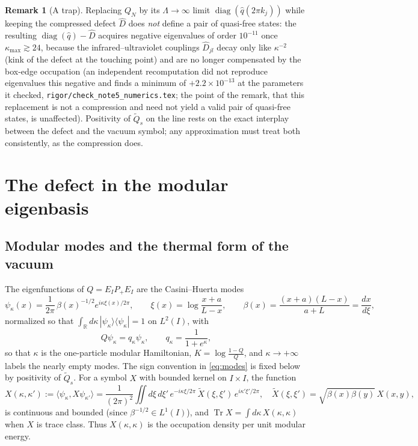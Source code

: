 \documentclass[11pt]{article}
\theoremstyle{accent}
\theoremstyle{definition}
\newtheorem{remark}[theorem]{Remark}
\newcommand{\Tr}{\operatorname{Tr}}
\begin{document}
\begin{remark}[A trap]
Replacing \(Q_N\) by its \(\Lambda\to\infty\) limit \(\operatorname{diag}(\widehat q(2\pi k_j))\) while keeping the compressed defect \(\widehat D\) does \emph{not} define a pair of quasi-free states: the resulting \(\operatorname{diag}(\widehat q)-\widehat D\) acquires negative eigenvalues of order \(10^{-11}\) once \(\kappa_{\max}\gtrsim24\), because the infrared--ultraviolet couplings \(\widehat D_{jl}\) decay only like \(\kappa^{-2}\) (kink of the defect at the touching point) and are no longer compensated by the box-edge occupation (an independent recomputation did not reproduce eigenvalues this negative and finds a minimum of \(+2.2\times10^{-13}\) at the parameters it checked, \texttt{rigor/check\_note5\_numerics.tex}; the point of the remark, that this replacement is not a compression and need not yield a valid pair of quasi-free states, is unaffected).  Positivity of \(\widetilde Q_s\) on the line rests on the exact interplay between the defect and the vacuum symbol; any approximation must treat both consistently, as the compression does.
\end{remark}

\section{The defect in the modular eigenbasis}\label{sec:modular}

\subsection{Modular modes and the thermal form of the vacuum}

The eigenfunctions of \(Q=E_IP_+E_I\) are the Casini--Huerta modes
\begin{equation}\label{eq:modes}
 \psi_\kappa(x)=\frac{1}{2\pi}\,\beta(x)^{-1/2}e^{i\kappa\xi(x)/2\pi},
 \qquad
 \xi(x)=\log\frac{x+a}{L-x},\qquad \beta(x)=\frac{(x+a)(L-x)}{a+L}=\frac{dx}{d\xi},
\end{equation}
normalized so that \(\int_{\mathbb R}d\kappa\,|\psi_\kappa\rangle\langle\psi_\kappa|=1\) on \(L^2(I)\), with
\begin{equation}\label{eq:fermi}
 Q\psi_\kappa=q_\kappa\psi_\kappa,\qquad q_\kappa=\frac1{1+e^{\kappa}},
\end{equation}
so that \(\kappa\) is the one-particle modular Hamiltonian, \(K=\log\frac{1-Q}{Q}\), and \(\kappa\to+\infty\) labels the nearly empty modes.  The sign convention in \eqref{eq:modes} is fixed below by positivity of \(\widetilde Q_s\).  For a symbol \(X\) with bounded kernel on \(I\times I\), the function
\begin{equation}\label{eq:mode-kernel}
 X(\kappa,\kappa'):=\langle\psi_\kappa,X\psi_{\kappa'}\rangle
 =\frac{1}{(2\pi)^2}\iint d\xi\,d\xi'\,e^{-i\kappa\xi/2\pi}\,\widetilde X(\xi,\xi')\,e^{i\kappa'\xi'/2\pi},
 \quad \widetilde X(\xi,\xi')=\sqrt{\beta(x)\beta(y)}\,X(x,y),
\end{equation}
is continuous and bounded (since \(\beta^{-1/2}\in L^1(I)\)), and \(\Tr X=\int d\kappa\,X(\kappa,\kappa)\) when \(X\) is trace class.  Thus \(X(\kappa,\kappa)\) is the occupation density per unit modular energy.
\end{document}
